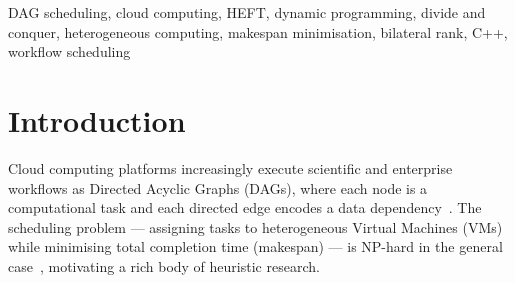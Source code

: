 \documentclass[conference]{IEEEtran}
\begin{document}
\begin{abstract}
Scheduling computational workflows represented as Directed Acyclic
Graphs (DAGs) onto heterogeneous Virtual Machines (VMs) is a
fundamental NP-hard problem in cloud computing. This paper presents
and compares the schedulers implemented in the C++17 framework: (1)
\emph{HEFT} as the classical baseline, (2) \emph{DP-HEFT} with
bilateral-rank and 2-task look-ahead (reported by the program as
\texttt{"HEFT + DP"}), (3) \emph{Enhanced DP (EDP-HEFT)} with a
full global DP assignment, (4) \emph{Divide-and-Conquer} (D\&C) with
level decomposition, (5) the greedy \emph{Min-Min} level heuristic
(implemented as \texttt{scheduleLevel MinMin} in \texttt{merge.cpp}),
and (6) \emph{Merge}, a hybrid scheduler (reported by the program as
\texttt{"Optimization Algorithm (OP)"}) that adaptively selects per-
level strategies and applies refinement. All methods share a unified
communication-cost model and a reproducible DAG generator. Comparative
analysis highlights the complexity–quality trade-off between fast
greedy heuristics and more expensive global/refined optimisation.
\end{abstract}

\begin{IEEEkeywords}
DAG scheduling, cloud computing, HEFT, dynamic programming,
divide and conquer, heterogeneous computing, makespan minimisation,
bilateral rank, C++, workflow scheduling
\end{IEEEkeywords}

\section{Introduction}
\label{sec:intro}

Cloud computing platforms increasingly execute scientific and
enterprise workflows as Directed Acyclic Graphs (DAGs), where each
node is a computational task and each directed edge encodes a data
dependency~\cite{deelman2009workflows,buyya2009cloud}. The
scheduling problem — assigning tasks to heterogeneous Virtual
Machines (VMs) while minimising total completion time (makespan) —
is NP-hard in the
general case~\cite{ullman1975np,garey1979computers}, motivating
a rich body of heuristic research.
\end{document}
